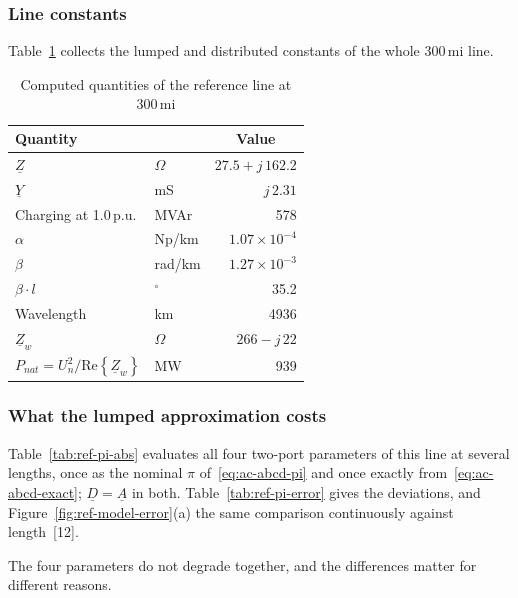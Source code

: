 \subsubsection{Line constants}
\label{sec:ref-constants}

Table~\ref{tab:ref-computed} collects the lumped and distributed constants
of the whole 300\,mi line.

\begin{table}[!ht]
  \centering
  \begin{tabular}{@{}l l r@{}}
    \toprule
    \textbf{Quantity} & & \multicolumn{1}{c}{\textbf{Value}} \\
    \midrule
    $\underline{Z}$ & $\Omega$ & $27.5 + j\,162.2$ \\
    $\underline{Y}$ & mS & $j\,2.31$ \\
    Charging at 1.0\,p.u. & MVAr & 578 \\
    \midrule
    $\alpha$ & Np/km & $1.07 \times 10^{-4}$ \\
    $\beta$ & rad/km & $1.27 \times 10^{-3}$ \\
    $\beta \cdot l$ & $^\circ$ & 35.2 \\
    Wavelength & km & 4936 \\
    $\underline{Z}_w$ & $\Omega$ & $266 - j\,22$ \\
    $P_{nat} = U_n^2 / \mathrm{Re}\left\{\underline{Z}_w\right\}$ & MW & 939 \\
    \bottomrule
  \end{tabular}
  \caption{Computed quantities of the reference line at 300\,mi}
  \label{tab:ref-computed}
\end{table}

\subsubsection{What the lumped approximation costs}
\label{sec:ref-pi-error}

Table~\ref{tab:ref-pi-abs} evaluates all four two-port parameters of this
line at several lengths, once as the nominal $\pi$ of~\eqref{eq:ac-abcd-pi}
and once exactly from~\eqref{eq:ac-abcd-exact}; $\underline{D} =
\underline{A}$ in both. Table~\ref{tab:ref-pi-error} gives the deviations,
and Figure~\ref{fig:ref-model-error}(a) the same comparison continuously
against length~[12].

The four parameters do not degrade together, and the differences matter for
different reasons.

